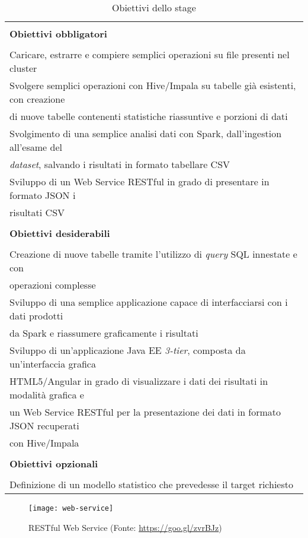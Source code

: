 \begin{table}[!h] %
	\caption{Obiettivi dello stage}
	\label{tab:obiettivi-stage}
	\begin{tabular}{|l|}
		\hline
		\\
		\textbf{Obiettivi obbligatori}\\
		\\
		\hline
		Caricare, estrarre e compiere semplici operazioni su file presenti nel \gls{cluster}	\\
		\hline
		Svolgere semplici operazioni con Hive/Impala su tabelle già esistenti, con creazione \\ di nuove tabelle contenenti statistiche riassuntive e porzioni di dati	\\
		\hline
		Svolgimento di una semplice analisi dati con Spark, dall'ingestion all'esame del \\ \textit{dataset}, salvando i risultati in formato tabellare CSV	\\
		\hline
		Sviluppo di un \gls{Web Service} RESTful in grado di presentare in formato JSON i \\ risultati CSV \\
		\hline
		\hline
		\\
		\textbf{Obiettivi desiderabili}\\
		\\
		\hline
		Creazione di nuove tabelle tramite l'utilizzo di \textit{query} SQL innestate e con \\ operazioni complesse \\
		\hline
		Sviluppo di una semplice applicazione capace di interfacciarsi con i dati prodotti \\ da Spark e riassumere graficamente i risultati \\
		\hline
		Sviluppo di un'applicazione Java EE \textit{3-tier}, composta da un'interfaccia grafica \\ HTML5/Angular in grado di visualizzare i dati dei risultati in modalità grafica e \\ un Web Service RESTful per la presentazione dei dati in formato JSON recuperati \\ con Hive/Impala \\
		\hline
		\hline
		\\
		\textbf{Obiettivi opzionali}\\
		\\
		\hline
		Definizione di un modello statistico che prevedesse il target richiesto \\
		\hline
	\end{tabular}
\end{table}%
\clearpage
\begin{figure}[!h] 
	\centering 
	\texttt{[image: web-service]}
	\caption{RESTful Web Service (Fonte: \href{https://goo.gl/zvrBJz}{https://goo.gl/zvrBJz})}
\end{figure}

